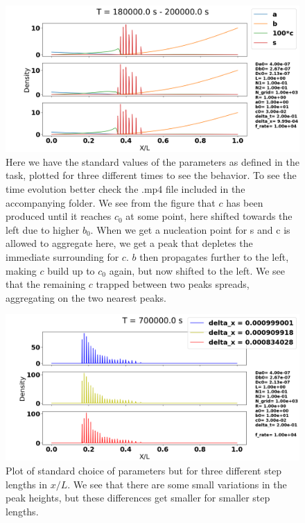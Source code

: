 \documentclass[1p]{elsarticle}        	%
\begin{document}
\begin{figure}[h]
	\centering
	\includegraphics[width=\linewidth]{../figures/standard_settings_time.png}
	\caption{Here we have the standard values of the parameters as defined in the task, plotted for three different times to see the behavior. To see the time evolution better check the .mp4 file included in the accompanying folder. We see from the figure that $c$ has been produced until it reaches $c_0$ at some point, here shifted towards the left due to higher $b_0$. When we get a nucleation point for s and c is allowed to aggregate here, we get a peak that depletes the immediate surrounding for $c$. $b$ then propagates further to the left, making $c$ build up to $c_0$ again, but now shifted to the left. We see that the  remaining $c$ trapped between two peaks spreads, aggregating on the two nearest peaks.}
	\label{fig:stand}
\end{figure}

\begin{figure}
	\centering
	\includegraphics[width=\linewidth]{../figures/deltaX.png}
	\caption{Plot of standard choice of parameters but for three different step lengths in $x/L$. We see that there are some small variations in the peak heights, but these differences get smaller for smaller step lengths.}
	\label{fig:coords}
\end{figure}
\end{document}

